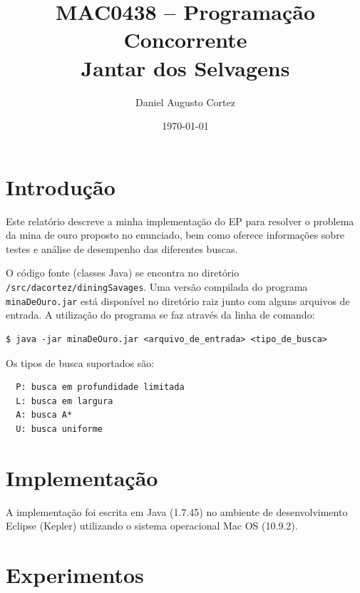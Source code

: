 \documentclass[11pt,a4paper]{article}
\newcommand{\zerar}{\setcounter{equation}{0}\setcounter{figure}{0}\setcounter{table}{0}}
\begin{document}
\title{{\sc MAC0438 -- Programação Concorrente} \\ \vspace{0.5cm} {\bf Jantar dos Selvagens}}
\author{Daniel Augusto Cortez}
\date{\today}

\maketitle


\zerar
\section{Introdução}
\label{sec:intro}

Este relatório descreve a minha implementação do EP para resolver o problema da mina de ouro 
proposto no enunciado, bem como oferece informações sobre testes e análise de desempenho das 
diferentes buscas.


O código fonte (classes Java) se encontra no diretório \verb|/src/dacortez/diningSavages|. Uma 
versão compilada do programa \verb|minaDeOuro.jar| está disponível no diretório raiz junto com 
alguns arquivos de entrada. A utilização do programa se faz através da linha de comando:
%
\begin{verbatim}
$ java -jar minaDeOuro.jar <arquivo_de_entrada> <tipo_de_busca>
\end{verbatim}
%
Os tipos de busca suportados são:
%
\begin{verbatim}
  P: busca em profundidade limitada
  L: busca em largura
  A: busca A*
  U: busca uniforme
\end{verbatim}


\zerar
\section{Implementação}
\label{sec:imp}

A implementação foi escrita em Java (1.7.45) no ambiente de desenvolvimento Eclipse (Kepler) 
utilizando o sistema operacional Mac OS (10.9.2).



\section{Experimentos}
\label{sec:exp}
\end{document}
